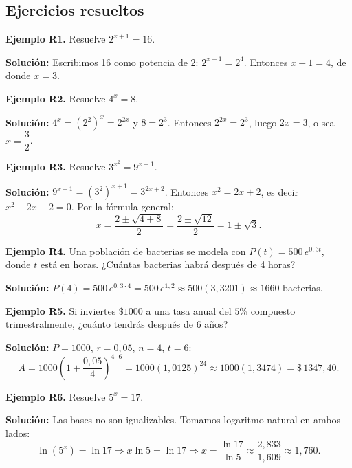 \documentclass[12pt, letterpaper]{article}
\begin{document}
\subsection{Ejercicios resueltos}

\textbf{Ejemplo R1.} Resuelve $2^{x+1} = 16$.

\begin{cuadrosolucion}
  \textbf{Solución:} Escribimos 16 como potencia de 2: $2^{x+1} = 2^4$. Entonces $x + 1 = 4$, de donde $x = 3$.
\end{cuadrosolucion}

\textbf{Ejemplo R2.} Resuelve $4^x = 8$.

\begin{cuadrosolucion}
  \textbf{Solución:} $4^x = (2^2)^x = 2^{2x}$ y $8 = 2^3$. Entonces $2^{2x} = 2^3$, luego $2x = 3$, o sea $x = \dfrac{3}{2}$.
\end{cuadrosolucion}

\textbf{Ejemplo R3.} Resuelve $3^{x^2} = 9^{x+1}$.

\begin{cuadrosolucion}
  \textbf{Solución:} $9^{x+1} = (3^2)^{x+1} = 3^{2x+2}$. Entonces $x^2 = 2x + 2$, es decir $x^2 - 2x - 2 = 0$. Por la fórmula general:
  $$x = \frac{2 \pm \sqrt{4 + 8}}{2} = \frac{2 \pm \sqrt{12}}{2} = 1 \pm \sqrt{3}.$$
\end{cuadrosolucion}

\textbf{Ejemplo R4.} Una población de bacterias se modela con $P(t) = 500\,e^{0{,}3t}$, donde $t$ está en horas. ¿Cuántas bacterias habrá después de 4 horas?

\begin{cuadrosolucion}
  \textbf{Solución:} $P(4) = 500\,e^{0{,}3 \cdot 4} = 500\,e^{1{,}2} \approx 500(3{,}3201) \approx 1660$ bacterias.
\end{cuadrosolucion}

\textbf{Ejemplo R5.} Si inviertes $\$1000$ a una tasa anual del $5\%$ compuesto trimestralmente, ¿cuánto tendrás después de 6 años?

  \begin{cuadrosolucion}
    \textbf{Solución:} $P = 1000$, $r = 0{,}05$, $n = 4$, $t = 6$:
    $$A = 1000\left(1 + \frac{0{,}05}{4}\right)^{4 \cdot 6} = 1000(1{,}0125)^{24} \approx 1000(1{,}3474) = \$\,1347{,}40.$$
  \end{cuadrosolucion}

  \textbf{Ejemplo R6.} Resuelve $5^x = 17$.

  \begin{cuadrosolucion}
    \textbf{Solución:} Las bases no son igualizables. Tomamos logaritmo natural en ambos lados:
    $$\ln(5^x) = \ln 17 \Rightarrow x \ln 5 = \ln 17 \Rightarrow x = \frac{\ln 17}{\ln 5} \approx \frac{2{,}833}{1{,}609} \approx 1{,}760.$$
  \end{cuadrosolucion}
\end{document}
